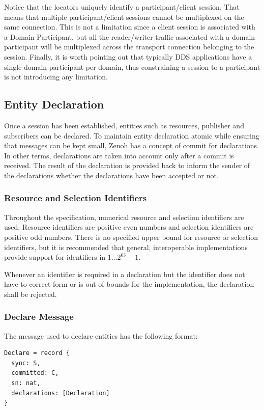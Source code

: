 \documentclass[a4paper,oneside,article]{memoir}
\begin{document}
Notice that the locators uniquely identify a participant/client session.  That means that multiple
participant/client sessions cannot be multiplexed on the same connection.  This is not a limitation
since a client session is associated with a Domain Participant, but all the reader/writer traffic
associated with a domain participant will be multiplexed across the transport connection belonging
to the session.  Finally, it is worth pointing out that typically DDS applications have a single
domain participant per domain, thus constraining a session to a participant is not introducing any
limitation.

\subsection{Entity Declaration}

Once a session has been established, entities such as resources, publisher and subscribers can be
declared.  To maintain entity declaration atomic while ensuring that messages can be kept small,
Zenoh has a concept of commit for declarations.  In other terms, declarations are taken into account
only after a commit is received.  The result of the declaration is provided back to inform the
sender of the declarations whether the declarations have been accepted or not.

\subsubsection{Resource and Selection Identifiers}

Throughout the specification, numerical resource and selection identifiers are used.  Resource
identifiers are positive even numbers and selection identifiers are positive odd numbers.  There is
no specified upper bound for resource or selection identifiers, but it is recommended that general,
interoperable implementations provide support for identifiers in $1 \ldots{} 2^{63}-1$.

Whenever an identifier is required in a declaration but the identifier does not have to correct form
or is out of bounds for the implementation, the declaration shall be rejected.

\subsubsection{Declare Message}

The message used to declare entities has the following format:
\begin{verbatim}
Declare = record {
  sync: S,
  committed: C,
  sn: nat,
  declarations: [Declaration]
}  
\end{verbatim}
\end{document}
